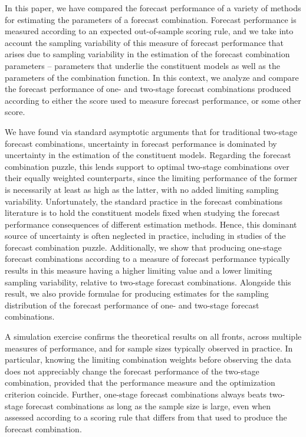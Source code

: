 \documentclass[12pt]{article}
\theoremstyle{definition}
\theoremstyle{remark}
\begin{document}
In this paper, we have compared the forecast performance of a variety of methods for estimating the parameters of a forecast combination. Forecast performance is measured according to an expected out-of-sample scoring rule, and we take into account the sampling variability of this measure of forecast performance that arises due to sampling variability in the estimation of the forecast combination parameters -- parameters that underlie the constituent models as well as the parameters of the combination function. In this context, we analyze and compare the forecast performance of one- and two-stage forecast combinations produced according to either the score used to measure forecast performance, or some other score.

We have found via standard asymptotic arguments that for traditional two-stage forecast combinations, uncertainty in forecast performance is dominated by uncertainty in the estimation of the constituent models. Regarding the forecast combination puzzle, this lends support to optimal two-stage combinations over their equally weighted counterparts, since the limiting performance of the former is necessarily at least as high as the latter, with no added limiting sampling variability. Unfortunately, the standard practice in the forecast combinations literature is to hold the constituent models fixed when studying the forecast performance consequences of different estimation methods. Hence, this dominant source of uncertainty is often neglected in practice, including in studies of the forecast combination puzzle. Additionally, we show that producing one-stage forecast combinations according to a measure of forecast performance typically results in this measure having a higher limiting value and a lower limiting sampling variability, relative to two-stage forecast combinations. Alongside this result, we also provide formulae for producing estimates for the sampling distribution of the forecast performance of one- and two-stage
forecast combinations.

A simulation exercise confirms the theoretical results on all fronts, across multiple measures of performance, and for sample sizes typically observed in practice. In particular, knowing the limiting combination weights before observing the data does not appreciably change the forecast performance of the two-stage combination, provided that the performance measure and the optimization criterion coincide. Further, one-stage forecast combinations always beats two-stage forecast combinations as long as the sample size is large, even when assessed according to a scoring rule that differs from that used to produce the forecast combination.
\end{document}
